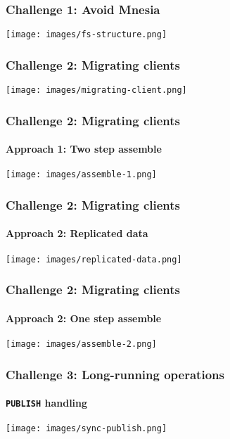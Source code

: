 \documentclass{beamer}
\begin{document}
\begin{frame}
    \frametitle{Challenge 1: Avoid Mnesia}

    \begin{center}
        \texttt{[image: images/fs-structure.png]}
    \end{center}
\end{frame}

\begin{frame}
    \frametitle{Challenge 2: Migrating clients}

    \begin{center}
        \texttt{[image: images/migrating-client.png]}
    \end{center}
\end{frame}

\begin{frame}
    \frametitle{Challenge 2: Migrating clients}
    \framesubtitle{Approach 1: Two step assemble}

    \begin{center}
        \texttt{[image: images/assemble-1.png]}
    \end{center}
\end{frame}

\begin{frame}
    \frametitle{Challenge 2: Migrating clients}
    \framesubtitle{Approach 2: Replicated data}

    \begin{center}
        \texttt{[image: images/replicated-data.png]}
    \end{center}
\end{frame}

\begin{frame}
    \frametitle{Challenge 2: Migrating clients}
    \framesubtitle{Approach 2: One step assemble}

    \begin{center}
        \texttt{[image: images/assemble-2.png]}
    \end{center}
\end{frame}

\begin{frame}
    \frametitle{Challenge 3: Long-running operations}
    \framesubtitle{\lstinline{PUBLISH} handling}

    \begin{center}
        \texttt{[image: images/sync-publish.png]}
    \end{center}
\end{frame}
\end{document}
